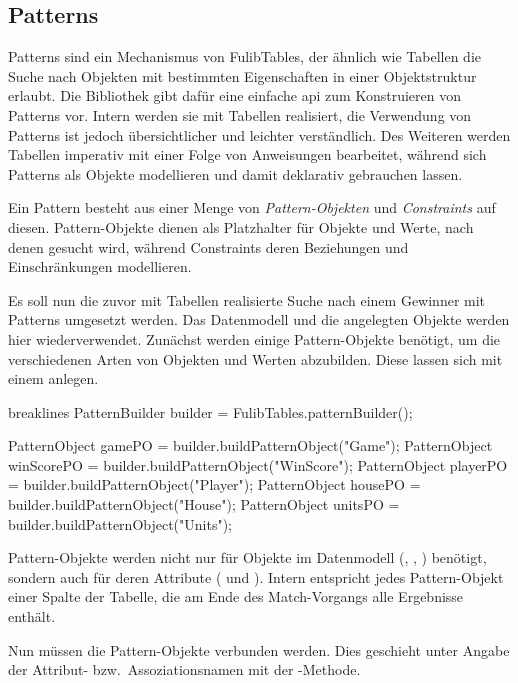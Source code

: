 \subsection{Patterns}\label{subsec:patterns}

Patterns sind ein Mechanismus von FulibTables, der ähnlich wie Tabellen die Suche nach Objekten mit bestimmten Eigenschaften in einer Objektstruktur erlaubt.
Die Bibliothek gibt dafür eine einfache \ac{api} zum Konstruieren von Patterns vor.
Intern werden sie mit Tabellen realisiert, die Verwendung von Patterns ist jedoch übersichtlicher und leichter verständlich.
Des Weiteren werden Tabellen imperativ mit einer Folge von Anweisungen bearbeitet, während sich Patterns als Objekte modellieren und damit deklarativ gebrauchen lassen.

Ein Pattern besteht aus einer Menge von \emph{Pattern-Objekten} und \emph{Constraints} auf diesen.
Pattern-Objekte dienen als Platzhalter für Objekte und Werte, nach denen gesucht wird, während Constraints deren Beziehungen und Einschränkungen modellieren.

Es soll nun die zuvor mit Tabellen realisierte Suche nach einem Gewinner mit Patterns umgesetzt werden.
Das Datenmodell und die angelegten Objekte werden hier wiederverwendet.
Zunächst werden einige Pattern-Objekte benötigt, um die verschiedenen Arten von Objekten und Werten abzubilden.
Diese lassen sich mit einem  anlegen.

\begin{jcodeblock*}{breaklines}
    PatternBuilder builder = FulibTables.patternBuilder();

    PatternObject gamePO = builder.buildPatternObject("Game");
    PatternObject winScorePO = builder.buildPatternObject("WinScore");
    PatternObject playerPO = builder.buildPatternObject("Player");
    PatternObject housePO = builder.buildPatternObject("House");
    PatternObject unitsPO = builder.buildPatternObject("Units");
\end{jcodeblock*}

Pattern-Objekte werden nicht nur für Objekte im Datenmodell (, , ) benötigt, sondern auch für deren Attribute ( und ).
Intern entspricht jedes Pattern-Objekt einer Spalte der Tabelle, die am Ende des Match-Vorgangs alle Ergebnisse enthält.

Nun müssen die Pattern-Objekte verbunden werden.
Dies geschieht unter Angabe der Attribut- bzw.\ Assoziationsnamen mit der -Methode.

